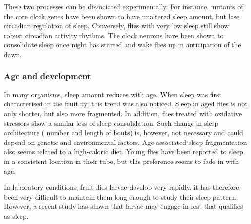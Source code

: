 These two processes can be dissociated experimentally.
For instance, mutants of the core clock genes have been shown to have unaltered sleep amount, but lose circadian regulation of sleep\cite{hendricks_gender_2003}.
Conversely, flies with very low sleep still show robust circadian activity rhythms.
The clock neurons have been shown to consolidate sleep once night has started and wake flies up in anticipation of the dawn\cite{kunst_calcitonin_2014,liu_wide_2014}.
%
%
%


\subsubsection{Age and development}
In many organisms, sleep amount reduces with age\cite{koh_drosophila_2006}.
When sleep was first characterised in the fruit fly, this trend was also noticed\cite{shaw_correlates_2000}.
Sleep in aged flies is not only shorter, but also more fragmented\cite{koh_drosophila_2006, zimmerman_video_2008}.
In addition, flies treated with oxidative stressors show a similar loss of sleep consolidation\cite{koh_drosophila_2006}.
Such change in sleep architecture (\ie{} number and length of bouts) is, however, not necessary and could depend on genetic and environmental factors\cite{bushey_sleep_2010, zimmerman_genetic_2012}.
Age-associated sleep fragmentation also seems related to a high-caloric diet\cite{yamazaki_high_2012}.
Young flies have been reported to sleep in a consistent location in their tube, but this preference seems to fade in with age\cite{dilley_behavioral_2018}.


In laboratory conditions, fruit flies larvae develop very rapidly, it has therefore been very difficult to maintain them long enough to study their sleep pattern.
However, a recent study has shown that larvae may engage in rest that qualifies as sleep\cite{szuperak_sleep_2018}.


